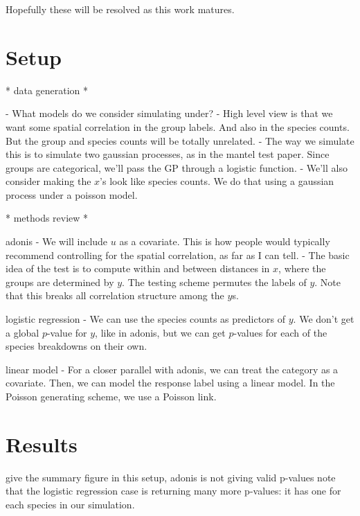 \documentclass{article}
\begin{document}
Hopefully these will be resolved as this work matures.

\section{Setup}
\label{sec:setup}

* data generation *

- What models do we consider simulating under?
- High level view is that we want some spatial correlation in the group labels.
And also in the species counts. But the group and species counts will be totally
unrelated.
- The way we simulate this is to simulate two gaussian processes, as in the
mantel test paper. Since groups are categorical, we'll pass the GP through a
logistic function.
- We'll also consider making the $x$'s look like species counts. We do that
using a gaussian process under a poisson model.

* methods review *

adonis
- We will include $u$ as a covariate. This is how people would typically
recommend controlling for the spatial correlation, as far as I can tell.
- The basic idea of the test is to compute within and between distances in $x$,
where the groups are determined by $y$. The testing scheme permutes the labels
of $y$. Note that this breaks all correlation structure among the $y$s.

logistic regression
- We can use the species counts as predictors of $y$. We don't get a global
$p$-value for $y$, like in adonis, but we can get $p$-values for each of the
species breakdowns on their own.

linear model
- For a closer parallel with adonis, we can treat the category as a covariate.
Then, we can model the response label using a linear model. In the Poisson
generating scheme, we use a Poisson link.

\section{Results}
\label{sec:results}

give the summary figure
in this setup, adonis is not giving valid p-values
note that the logistic regression case is returning many more p-values: it has
one for each species in our simulation.



\end{document}

